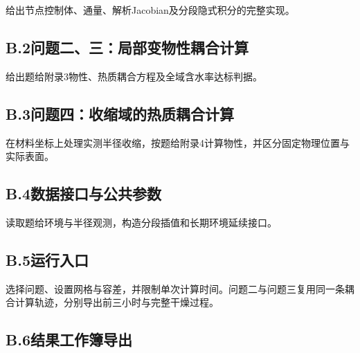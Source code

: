给出节点控制体、通量、解析Jacobian及分段隐式积分的完整实现。



\subsection*{B.2\quad 问题二、三：局部变物性耦合计算}

给出题给附录3物性、热质耦合方程及全域含水率达标判据。



\subsection*{B.3\quad 问题四：收缩域的热质耦合计算}

在材料坐标上处理实测半径收缩，按题给附录4计算物性，并区分固定物理位置与实际表面。



\subsection*{B.4\quad 数据接口与公共参数}

读取题给环境与半径观测，构造分段插值和长期环境延续接口。



\subsection*{B.5\quad 运行入口}

选择问题、设置网格与容差，并限制单次计算时间。问题二与问题三复用同一条耦合计算轨迹，分别导出前三小时与完整干燥过程。



\subsection*{B.6\quad 结果工作簿导出}

